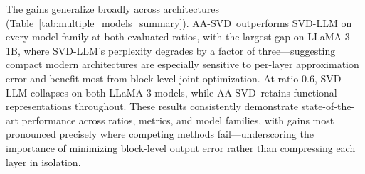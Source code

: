 \documentclass[10pt]{article} %
\theoremstyle{definition}
\theoremstyle{remark}
\newcommand{\ourmethod}{{\textsc{AA-SVD}}}
\newcommand{\ourmethodlight}{{\textsc{AA-SVD}}}
\begin{document}
The gains generalize broadly across architectures (Table~\ref{tab:multiple_models_summary}).
\ourmethodlight~outperforms SVD-LLM on every model family at both evaluated ratios, with the largest gap on LLaMA-3-1B, where SVD-LLM's perplexity degrades by a factor of three---suggesting compact modern architectures are especially sensitive to per-layer approximation error and benefit most from block-level joint optimization.
At ratio $0.6$, SVD-LLM collapses on both LLaMA-3 models, while \ourmethodlight~retains functional representations throughout.
% 
These results consistently demonstrate state-of-the-art performance across ratios, metrics, and model families, with gains most pronounced precisely where competing methods fail---underscoring the importance of minimizing block-level output error rather than compressing each layer in isolation.
% 
% 
\begin{table}[t]
\centering
\caption{Comparison of \ourmethod~with SOTA methods across multiple models at compression ratios $0.8$ and $0.6$. PPL refers to WikiText2 perplexity; Accuracy is averaged over seven commonsense reasoning benchmarks (zero-shot). Best performance is marked in bold.
}
\label{tab:multiple_models_summary}
\end{table}
\end{document}
